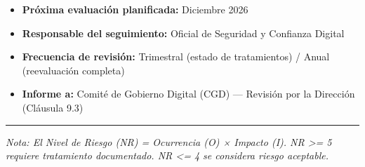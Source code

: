 \documentclass[10pt,letterpaper]{article}
\begin{document}
\begin{itemize}
\tightlist
\item
  \textbf{Próxima evaluación planificada:} Diciembre 2026
\item
  \textbf{Responsable del seguimiento:} Oficial de Seguridad y Confianza
  Digital
\item
  \textbf{Frecuencia de revisión:} Trimestral (estado de tratamientos) /
  Anual (reevaluación completa)
\item
  \textbf{Informe a:} Comité de Gobierno Digital (CGD) --- Revisión por
  la Dirección (Cláusula 9.3)
\end{itemize}

\begin{center}\rule{0.5\linewidth}{0.5pt}\end{center}

\emph{Nota: El Nivel de Riesgo (NR) = Ocurrencia (O) × Impacto (I). NR
\textgreater= 5 requiere tratamiento documentado. NR \textless= 4 se
considera riesgo aceptable.}
\end{document}
